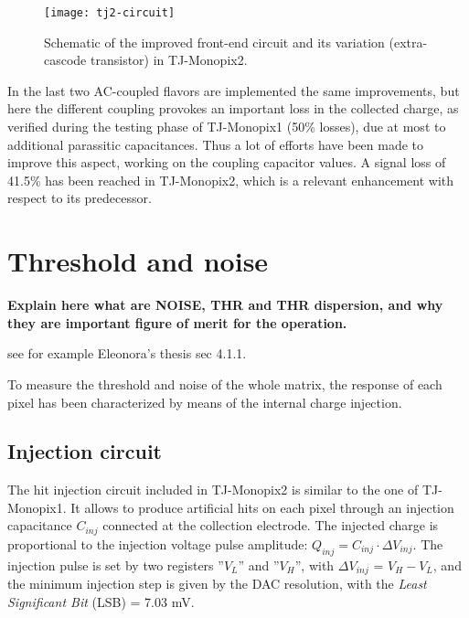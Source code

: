 \begin{figure}[h!]
\centering
\texttt{[image: tj2-circuit]}
\caption{Schematic of the improved front-end circuit and its variation (extra-cascode transistor) in TJ-Monopix2.}
\label{fig:tj2_circuit}
\end{figure}


In the last two AC-coupled flavors are implemented the same improvements, but here the different coupling provokes an important loss in the collected charge, as verified during the testing phase of TJ-Monopix1 (50\% losses), due at most to additional parassitic capacitances. Thus a lot of efforts have been made to improve this aspect, working on the coupling capacitor values. A signal loss of 41.5\% has been reached in TJ-Monopix2, which is a relevant enhancement with respect to its predecessor.





\section{Threshold and noise} \label{thresh_noise}


\textbf{Explain here what are NOISE, THR and THR dispersion, and why they are important figure of merit for the operation.} 

see for example Eleonora's thesis sec 4.1.1. 


To measure the threshold and noise of the whole matrix, the response of each pixel has been characterized by means of the internal charge injection. \\

\subsection{Injection circuit} \label{inj_circuit_subsection}

The hit injection circuit included in TJ-Monopix2 is similar to the one of TJ-Monopix1. 
It allows to produce artificial hits on each pixel through an injection capacitance \textbf{$C_{inj}$} connected at the collection electrode. The injected charge is proportional to the injection voltage pulse amplitude: $Q_{inj} = C_{inj} \cdot \Delta V_{inj}$. The injection pulse is set by two registers ''\textbf{$V_{L}$}'' and ''\textbf{$V_{H}$}'', with $\Delta V_{inj}$ = \textbf{$V_{H}-V_{L}$}, and the minimum injection step is given by the DAC resolution, with the \textit{Least Significant Bit} (LSB) = 7.03 mV. 

